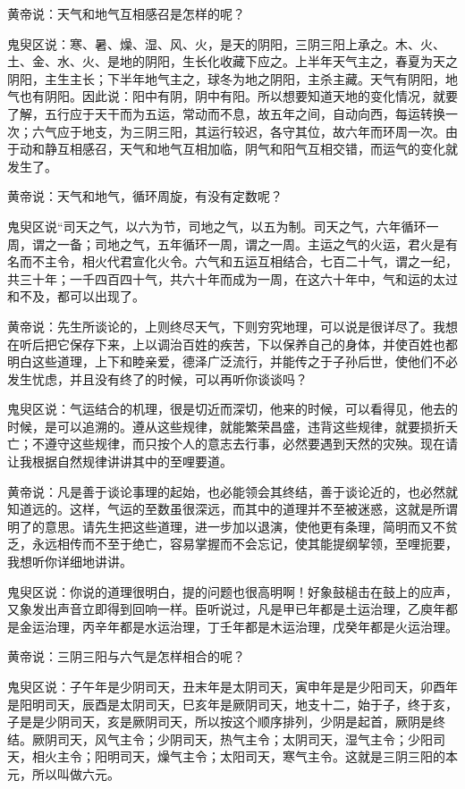 \documentclass[12pt,UTF8]{ctexbook}
\begin{document}
黄帝说：天气和地气互相感召是怎样的呢？

鬼臾区说：寒、暑、燥、湿、风、火，是天的阴阳，三阴三阳上承之。木、火、土、金、水、火、是地的阴阳，生长化收藏下应之。上半年天气主之，春夏为天之阴阳，主生主长；下半年地气主之，球冬为地之阴阳，主杀主藏。天气有阴阳，地气也有阴阳。因此说：阳中有阴，阴中有阳。所以想要知道天地的变化情况，就要了解，五行应于天干而为五运，常动而不息，故五年之间，自动向西，每运转换一次；六气应于地支，为三阴三阳，其运行较迟，各守其位，故六年而环周一次。由于动和静互相感召，天气和地气互相加临，阴气和阳气互相交错，而运气的变化就发生了。

黄帝说：天气和地气，循环周旋，有没有定数呢？

鬼臾区说“司天之气，以六为节，司地之气，以五为制。司天之气，六年循环一周，谓之一备；司地之气，五年循环一周，谓之一周。主运之气的火运，君火是有名而不主令，相火代君宣化火令。六气和五运互相结合，七百二十气，谓之一纪，共三十年；一千四百四十气，共六十年而成为一周，在这六十年中，气和运的太过和不及，都可以出现了。

黄帝说：先生所谈论的，上则终尽天气，下则穷究地理，可以说是很详尽了。我想在听后把它保存下来，上以调治百姓的疾苦，下以保养自己的身体，并使百姓也都明白这些道理，上下和睦亲爱，德泽广泛流行，并能传之于子孙后世，使他们不必发生忧虑，并且没有终了的时候，可以再听你谈谈吗？

鬼臾区说：气运结合的机理，很是切近而深切，他来的时候，可以看得见，他去的时候，是可以追溯的。遵从这些规律，就能繁荣昌盛，违背这些规律，就要损折夭亡；不遵守这些规律，而只按个人的意志去行事，必然要遇到天然的灾殃。现在请让我根据自然规律讲讲其中的至哩要道。

黄帝说：凡是善于谈论事理的起始，也必能领会其终结，善于谈论近的，也必然就知道远的。这样，气运的至数虽很深远，而其中的道理并不至被迷惑，这就是所谓明了的意思。请先生把这些道理，进一步加以退演，使他更有条理，简明而又不贫乏，永远相传而不至于绝亡，容易掌握而不会忘记，使其能提纲挈领，至哩扼要，我想听你详细地讲讲。

鬼臾区说：你说的道理很明白，提的问题也很高明啊！好象鼓槌击在鼓上的应声，又象发出声音立即得到回响一样。臣听说过，凡是甲已年都是土运治理，乙庾年都是金运治理，丙辛年都是水运治理，丁壬年都是木运治理，戊癸年都是火运治理。

黄帝说：三阴三阳与六气是怎样相合的呢？

鬼臾区说：子午年是少阴司天，丑末年是太阴司天，寅申年是是少阳司天，卯酉年是阳明司天，辰酉是太阴司天，巳亥年是厥阴司天，地支十二，始于子，终于亥，子是是少阴司天，亥是厥阴司天，所以按这个顺序排列，少阴是起首，厥阴是终结。厥阴司天，风气主令；少阴司天，热气主令；太阴司天，湿气主令；少阳司天，相火主令；阳明司天，燥气主令；太阳司天，寒气主令。这就是三阴三阳的本元，所以叫做六元。
\end{document}
